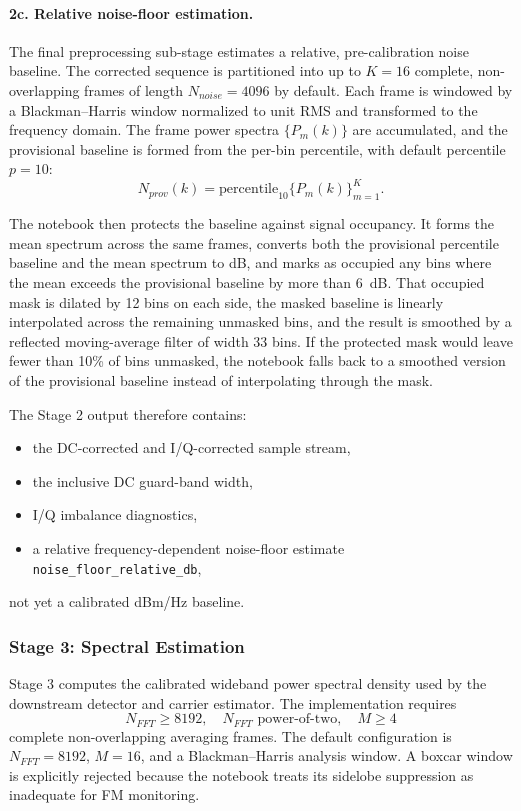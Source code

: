 \documentclass[11pt]{article}
\begin{document}
\paragraph{2c. Relative noise-floor estimation.} The final preprocessing sub-stage estimates a relative, pre-calibration noise baseline. The corrected sequence is partitioned into up to $K = 16$ complete, non-overlapping frames of length $N_{noise} = 4096$ by default. Each frame is windowed by a Blackman--Harris window normalized to unit RMS and transformed to the frequency domain. The frame power spectra $\{P_m(k)\}$ are accumulated, and the provisional baseline is formed from the per-bin percentile, with default percentile $p = 10$:
\begin{equation}
N_{prov}(k) = \text{percentile}_{10}\{P_m(k)\}_{m=1}^{K}.
\end{equation}

The notebook then protects the baseline against signal occupancy. It forms the mean spectrum across the same frames, converts both the provisional percentile baseline and the mean spectrum to dB, and marks as occupied any bins where the mean exceeds the provisional baseline by more than 6~dB. That occupied mask is dilated by 12 bins on each side, the masked baseline is linearly interpolated across the remaining unmasked bins, and the result is smoothed by a reflected moving-average filter of width 33 bins. If the protected mask would leave fewer than 10\% of bins unmasked, the notebook falls back to a smoothed version of the provisional baseline instead of interpolating through the mask.

The Stage 2 output therefore contains:
\begin{itemize}
    \item the DC-corrected and I/Q-corrected sample stream,
    \item the inclusive DC guard-band width,
    \item I/Q imbalance diagnostics,
    \item a relative frequency-dependent noise-floor estimate \texttt{noise\_floor\_relative\_db},
\end{itemize}
not yet a calibrated dBm/Hz baseline.

\subsubsection*{Stage 3: Spectral Estimation}

Stage 3 computes the calibrated wideband power spectral density used by the downstream detector and carrier estimator. The implementation requires
\begin{equation}
N_{FFT} \geq 8192, \quad N_{FFT} \text{ power-of-two}, \quad M \geq 4
\end{equation}
complete non-overlapping averaging frames. The default configuration is $N_{FFT} = 8192$, $M = 16$, and a Blackman--Harris analysis window. A boxcar window is explicitly rejected because the notebook treats its sidelobe suppression as inadequate for FM monitoring.
\end{document}
